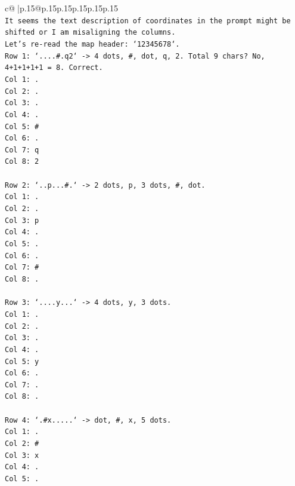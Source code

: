 \documentclass{article}
\begin{document}
{\begin{supertabular}{c@{$\;$}|p{.15\linewidth}@{}p{.15\linewidth}p{.15\linewidth}p{.15\linewidth}p{.15\linewidth}p{.15\linewidth}}
{{{\\ 
\texttt{It seems the text description of coordinates in the prompt might be shifted or I am misaligning the columns.} \\
\texttt{Let's re{-}read the map header: `12345678`.} \\
\texttt{Row 1: `....\#.q2` {-}> 4 dots, \#, dot, q, 2. Total 9 chars? No, 4+1+1+1+1 = 8. Correct.} \\
\texttt{Col 1: .} \\
\texttt{Col 2: .} \\
\texttt{Col 3: .} \\
\texttt{Col 4: .} \\
\texttt{Col 5: \#} \\
\texttt{Col 6: .} \\
\texttt{Col 7: q} \\
\texttt{Col 8: 2} \\
\\ 
\texttt{Row 2: `..p...\#.` {-}> 2 dots, p, 3 dots, \#, dot.} \\
\texttt{Col 1: .} \\
\texttt{Col 2: .} \\
\texttt{Col 3: p} \\
\texttt{Col 4: .} \\
\texttt{Col 5: .} \\
\texttt{Col 6: .} \\
\texttt{Col 7: \#} \\
\texttt{Col 8: .} \\
\\ 
\texttt{Row 3: `....y...` {-}> 4 dots, y, 3 dots.} \\
\texttt{Col 1: .} \\
\texttt{Col 2: .} \\
\texttt{Col 3: .} \\
\texttt{Col 4: .} \\
\texttt{Col 5: y} \\
\texttt{Col 6: .} \\
\texttt{Col 7: .} \\
\texttt{Col 8: .} \\
\\ 
\texttt{Row 4: `.\#x.....` {-}> dot, \#, x, 5 dots.} \\
\texttt{Col 1: .} \\
\texttt{Col 2: \#} \\
\texttt{Col 3: x} \\
\texttt{Col 4: .} \\
\texttt{Col 5: .} \\
}}}
\end{supertabular}}
\end{document}
